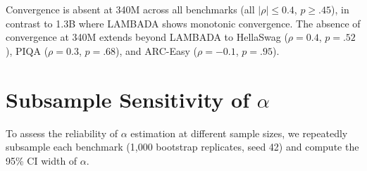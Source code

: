 \begin{table}[ht]
\centering
\small
\caption{340M vs.\ 1.3B per-example multiplicity across four benchmarks. $\alpha$: ambiguity at pure-recurrent configuration. Acc: mean accuracy across three architectures at pure-recurrent. $\bar{J}_{h}$/$\bar{J}_{u}$: mean pairwise Jaccard of helped/hurt sets. $\Delta\alpha$: 340M $-$ 1.3B.}
\label{tab:340m_multi_bench}
\end{table}

Convergence is absent at 340M across all benchmarks (all $|\rho| \leq 0.4$, $p \geq .45$), in contrast to 1.3B where LAMBADA shows monotonic convergence. The absence of convergence at 340M extends beyond LAMBADA to HellaSwag ($\rho = 0.4$, $p = .52$), PIQA ($\rho = 0.3$, $p = .68$), and ARC-Easy ($\rho = -0.1$, $p = .95$).

\section{Subsample Sensitivity of \texorpdfstring{$\alpha$}{α}}\label{app:subsample_sensitivity}

To assess the reliability of $\alpha$ estimation at different sample sizes, we repeatedly subsample each benchmark (1{,}000 bootstrap replicates, seed 42) and compute the 95\% CI width of $\alpha$.

